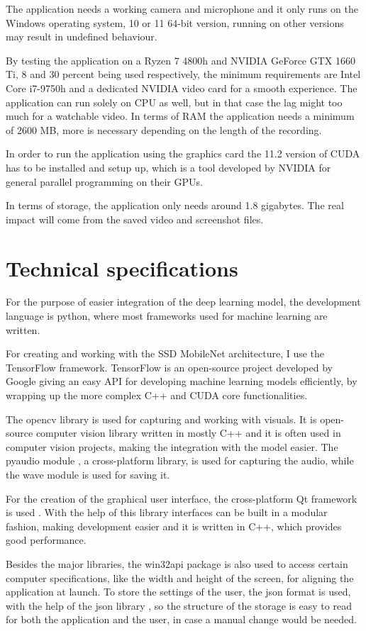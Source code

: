 \par The application needs a working camera and microphone and it only runs on the Windows operating system, 10 or 11 64-bit version, running on other versions may result in undefined behaviour.
\par By testing the application on a Ryzen 7 4800h and NVIDIA GeForce GTX 1660 Ti, 8 and 30 percent being used respectively, the minimum requirements are Intel Core i7-9750h and a dedicated NVIDIA video card for a smooth experience. The application can run solely on CPU as well, but in that case the lag might too much for a watchable video. In terms of RAM the application needs a minimum of 2600 MB, more is necessary depending on the length of the recording.
\par In order to run the application using the graphics card the 11.2 version of CUDA has to be installed and setup up, which is a tool developed by NVIDIA for general parallel programming on their GPUs.
\par In terms of storage, the application only needs around 1.8 gigabytes. The real impact will come from the saved video and screenshot files.

\label{sec:specssec2}

\section{Technical specifications}
\label{sec:specssec2}

\par For the purpose of easier integration of the deep learning model, the development language is python, where most frameworks used for machine learning are written.
\par For creating and working with the SSD MobileNet architecture, I use the TensorFlow \cite{tensorflow2015-whitepaper} framework. TensorFlow is an open-source project developed by Google giving an easy API for developing machine learning models efficiently, by wrapping up the more complex C++ and CUDA core functionalities.
\par The opencv library \cite{opencv_library} is used for capturing and working with visuals. It is open-source computer vision library written in mostly C++ and it is often used in computer vision projects, making the integration with the model easier. The pyaudio module \cite{pyaudio}, a cross-platform library, is used for capturing the audio, while the wave module \cite{wave} is used for saving it.  
\par For the creation of the graphical user interface, the cross-platform Qt framework is used \cite{QtPage}. With the help of this library interfaces can be built in a modular fashion, making development easier and it is written in C++, which provides good performance.
\par Besides the major libraries, the win32api package \cite{win32api} is also used to access certain computer specifications, like the width and height of the screen, for aligning the application at launch. To store the settings of the user, the json format is used, with the help of the json library \cite{jsonlib}, so the structure of the storage is easy to read for both the application and the user, in case a manual change would be needed.